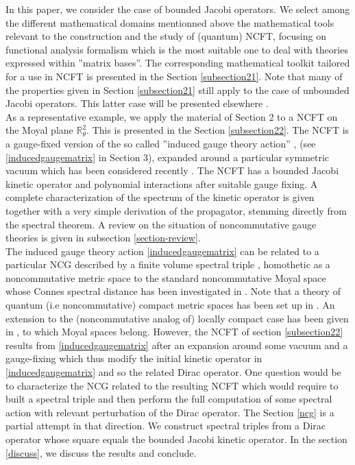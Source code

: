 \documentclass[a4paper,11pt,twoside]{article}
\numberwithin{equation}{section}
\theoremstyle{nonumberplain}
\begin{document}
In this paper, we consider the case of bounded Jacobi operators. We select among the different mathematical domains mentionned above the mathematical tools relevant to the construction and the study of (quantum) NCFT, focusing on functional analysis formalism which is the most suitable one to deal with theories expressed within ''matrix bases''. The corresponding mathematical toolkit tailored for a use in NCFT is presented in the Section \ref{subsection21}. Note that many of the properties given in Section \ref{subsection21} still apply to the case of unbounded Jacobi operators. This latter case will be presented elsewhere \cite{unboud-jac}. \\
As a representative example, we apply the material of Section 2 to a NCFT on the Moyal plane $\mathbb{R}^2_\theta$. This is presented in the Section \ref{subsection22}. The NCFT is a gauge-fixed version of the so called ''induced gauge theory action'' \cite{GWW}, \cite{GW07} (see \eqref{inducedgaugematrix} in Section 3), expanded around a particular symmetric vacuum \cite{GWW2} which has been considered recently \cite{MVW13}. The NCFT has a bounded Jacobi kinetic operator and polynomial interactions after suitable gauge fixing. A complete characterization of the spectrum of the kinetic operator is given together with a very simple derivation of the propagator, stemming directly from the spectral theorem. A review on the situation of noncommutative gauge theories is given in subsection \ref{section-review}.\\
The induced gauge theory action \eqref{inducedgaugematrix} can be related to a particular NCG described by a finite volume spectral triple \cite{finite-vol}, homothetic as a noncommutative metric space \cite{homot-moyal} to the standard noncommutative Moyal space \cite{marseil1} whose Connes spectral distance has been investigated in \cite{moyal1}. Note that a theory of quantum (i.e noncommutative) compact metric spaces has been set up in \cite{Rieffel}. An extension to the (noncommutative analog of) locally compact case has been given in \cite{latrem}, to which Moyal spaces belong. However, the NCFT of section \ref{subsection22} results from \eqref{inducedgaugematrix} after an expansion around some vacuum and a gauge-fixing which thus modify the initial kinetic operator in \eqref{inducedgaugematrix} and so the related Dirac operator. One question would be to characterize the NCG related to the resulting NCFT which would require to built a spectral triple and then perform the full computation of some
spectral action with relevant perturbation of the Dirac operator. The Section \ref{ncg} is a partial attempt in that direction. We construct spectral triples from a Dirac operator whose square equals the bounded Jacobi kinetic operator. In the section \ref{discuss}, we discuss the results and conclude.\par 
\end{document}
